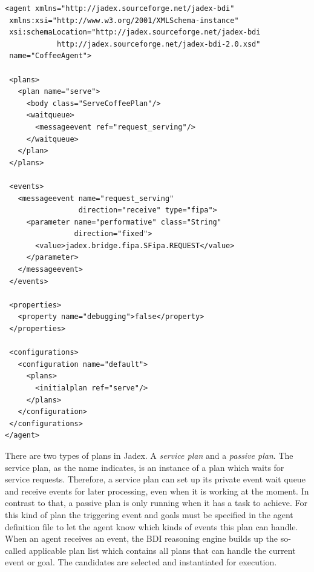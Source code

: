 \begin{lstlisting}[caption={Jadex XML file}, label=lst:jadex_xml]
<agent xmlns="http://jadex.sourceforge.net/jadex-bdi"
 xmlns:xsi="http://www.w3.org/2001/XMLSchema-instance"
 xsi:schemaLocation="http://jadex.sourceforge.net/jadex-bdi
            http://jadex.sourceforge.net/jadex-bdi-2.0.xsd"
 name="CoffeeAgent">

 <plans>
   <plan name="serve">
     <body class="ServeCoffeePlan"/>
     <waitqueue>
       <messageevent ref="request_serving"/>
     </waitqueue>
   </plan>
 </plans>

 <events>
   <messageevent name="request_serving"
                 direction="receive" type="fipa">
     <parameter name="performative" class="String"
                direction="fixed">
       <value>jadex.bridge.fipa.SFipa.REQUEST</value>
     </parameter>
   </messageevent>
 </events>

 <properties>
   <property name="debugging">false</property>
 </properties>

 <configurations>
   <configuration name="default">
     <plans>
       <initialplan ref="serve"/>
     </plans>
   </configuration>
 </configurations>
</agent>
\end{lstlisting}
There are two types of plans in Jadex.
A \emph{service plan} and a \emph{passive plan}.
The service plan, as the name indicates, is an instance of a plan which waits for service requests.
Therefore, a service plan can set up its private event wait queue and receive events for later processing, even when it is working at the moment.
In contrast to that, a passive plan is only running when it has a task to achieve.
For this kind of plan the triggering event and goals must be specified in the agent definition file to let the agent know which kinds of events this plan can handle.
When an agent receives an event, the BDI reasoning engine builds up the so-called applicable plan list which contains all plans that can handle the current event or goal.
The candidates are selected and instantiated for execution.

